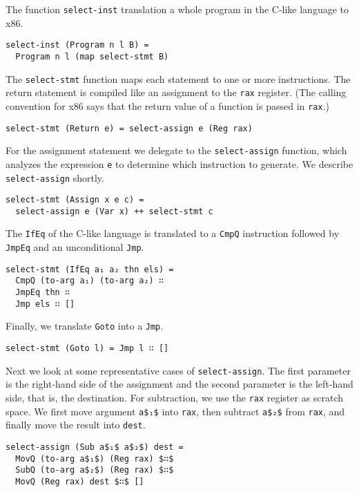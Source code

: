 \documentclass[sigplan,review,dvipsnames,screen,10pt]{acmart}
\begin{document}
The function \lstinline{select-inst} translation a whole program in
the C-like language to x86.
\begin{lstlisting}
select-inst (Program n l B) =
  Program n l (map select-stmt B)
\end{lstlisting}

\noindent The \lstinline{select-stmt} function maps each statement to
one or more instructions. The return statement is compiled like an
assignment to the \lstinline{rax} register. (The calling convention
for x86 says that the return value of a function is passed in
\lstinline{rax}.) 

\begin{lstlisting}
select-stmt (Return e) = select-assign e (Reg rax)
\end{lstlisting}

\noindent For the assignment statement we delegate to the
\lstinline{select-assign} function, which analyzes the expression
\lstinline{e} to determine which instruction to generate.
We describe \lstinline{select-assign} shortly.

\begin{lstlisting}
select-stmt (Assign x e c) =
  select-assign e (Var x) ++ select-stmt c
\end{lstlisting}

\noindent The \lstinline{IfEq} of the C-like language
is translated to a \lstinline{CmpQ} instruction followed
by \lstinline{JmpEq} and an unconditional \lstinline{Jmp}.

\begin{lstlisting}
select-stmt (IfEq a₁ a₂ thn els) =
  CmpQ (to-arg a₁) (to-arg a₂) ∷
  JmpEq thn ∷
  Jmp els ∷ []
\end{lstlisting}

\noindent Finally, we translate \lstinline{Goto} into a \lstinline{Jmp}.
\begin{lstlisting}
select-stmt (Goto l) = Jmp l ∷ [] 
\end{lstlisting}

Next we look at some representative cases of
\lstinline{select-assign}. The first parameter is the right-hand side
of the assignment and the second parameter is the left-hand side, that
is, the destination. For subtraction, we use the \lstinline{rax}
register as scratch space. We first move argument \lstinline{a$₁$}
into \lstinline{rax}, then subtract \lstinline{a$₂$} from
\lstinline{rax}, and finally move the result into \lstinline{dest}.

\begin{lstlisting}
select-assign (Sub a$₁$ a$₂$) dest =
  MovQ (to-arg a$₁$) (Reg rax) $∷$
  SubQ (to-arg a$₂$) (Reg rax) $∷$
  MovQ (Reg rax) dest $∷$ []
\end{lstlisting}
\end{document}
